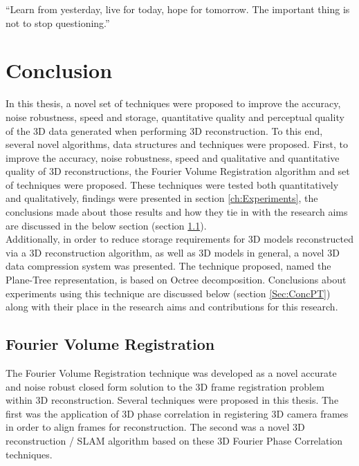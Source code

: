 \begin{savequote}[8cm]
  ``Learn from yesterday, live for today, hope for tomorrow. The important thing is not to stop questioning.''
\end{savequote}
\makeatletter
\chapter{Conclusion}
\label{ch:Conclusion}

In this thesis, a novel set of techniques were proposed to improve the accuracy, noise robustness, speed and storage, quantitative quality and perceptual quality of the 3D data generated when performing 3D reconstruction. To this end, several novel algorithms, data structures and techniques were proposed. First, to improve the accuracy, noise robustness, speed and qualitative and quantitative quality of 3D reconstructions, the Fourier Volume Registration algorithm and set of techniques were proposed. These techniques were tested both quantitatively and qualitatively, findings were presented in section \ref{ch:Experiments}, the conclusions made about those results and how they tie in with the research aims are discussed in the below section (section \ref{Sec:ConcFVR}). \\

Additionally, in order to reduce storage requirements for 3D models reconstructed via a 3D reconstruction algorithm, as well as 3D models in general, a novel 3D data compression system was presented. The technique proposed, named the Plane-Tree representation, is based on Octree decomposition. Conclusions about experiments using this technique are discussed below (section \ref{Sec:ConcPT}) along with their place in the research aims and contributions for this research. \\

\section{Fourier Volume Registration}
\label{Sec:ConcFVR}

The Fourier Volume Registration technique was developed as a novel accurate and noise robust closed form solution to the 3D frame registration problem within 3D reconstruction. Several techniques were proposed in this thesis. The first was the application of 3D phase correlation in registering 3D camera frames in order to align frames for reconstruction. The second was a novel 3D reconstruction / SLAM algorithm based on these 3D Fourier Phase Correlation techniques. \\

